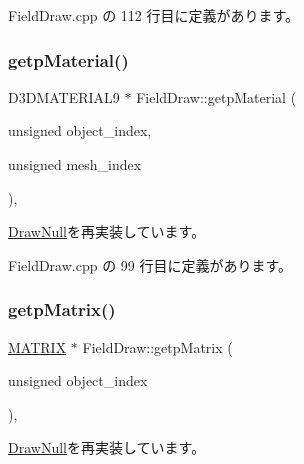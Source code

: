  Field\+Draw.\+cpp の 112 行目に定義があります。

\mbox{\label{class_field_draw_a5ed29c14e0013513d72f79f8651db805}} 
\subsubsection{\texorpdfstring{getp\+Material()}{getpMaterial()}}
{\footnotesize\ttfamily D3\+D\+M\+A\+T\+E\+R\+I\+A\+L9 $\ast$ Field\+Draw\+::getp\+Material (\begin{DoxyParamCaption}\item[{unsigned}]{object\+\_\+index,  }\item[{unsigned}]{mesh\+\_\+index }\end{DoxyParamCaption})\hspace{0.3cm}{\ttfamily [override]}, {\ttfamily [virtual]}}



\mbox{\hyperlink{class_draw_null_aa07d7e89e723b68ec257da0f63d43f70}{Draw\+Null}}を再実装しています。



 Field\+Draw.\+cpp の 99 行目に定義があります。

\mbox{\label{class_field_draw_ad399978201f737f4c0dd2b3990fa6b34}} 
\subsubsection{\texorpdfstring{getp\+Matrix()}{getpMatrix()}}
{\footnotesize\ttfamily \mbox{\hyperlink{_vector3_d_8h_a032295cd9fb1b711757c90667278e744}{M\+A\+T\+R\+IX}} $\ast$ Field\+Draw\+::getp\+Matrix (\begin{DoxyParamCaption}\item[{unsigned}]{object\+\_\+index }\end{DoxyParamCaption})\hspace{0.3cm}{\ttfamily [override]}, {\ttfamily [virtual]}}



\mbox{\hyperlink{class_draw_null_a001901c340671106a33d44b9d4aef4c4}{Draw\+Null}}を再実装しています。




